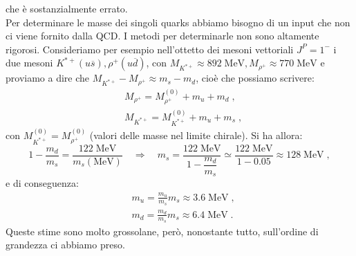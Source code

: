 \documentclass[12pt,a4paper]{article}
\theoremstyle{definition}
\numberwithin{equation}{section}
\begin{document}
che è sostanzialmente errato. \\
Per determinare le masse dei singoli quarks abbiamo bisogno di un input che non ci viene fornito dalla QCD. I metodi per determinarle non sono altamente rigorosi. Consideriamo per esempio nell'ottetto dei mesoni vettoriali $J^P=1^-$ i due mesoni $K^{*+} (u\overline{s}),\rho^+ (u\overline{d})$, con $M_{K^{*+}}\approx 892\;\mathrm{MeV}, M_{\rho^+}\approx 770\;\mathrm{MeV}$ e proviamo a dire che $M_{K^{*+}}-M_{\rho^+}\approx m_s-m_d$, cioè che possiamo scrivere:
\begin{align*}
&M_{\rho^+} = M_{\rho^+}^{(0)}+m_u+m_d\;, \\
&M_{K^{*+}}=M_{K^{*+}}^{(0)}+m_u+m_s\;,
\end{align*}
con $M_{K^{*+}}^{(0)}=M_{\rho^+}^{(0)}$ (valori delle masse nel limite chirale). Si ha allora:
\begin{equation}
1-\frac{m_d}{m_s}=\frac{122\;\mathrm{MeV}}{m_s(\mathrm{MeV})}\quad\Longrightarrow\quad m_s=\frac{122\;\mathrm{MeV}}{1-\dfrac{m_d}{m_s}}\simeq \frac{122\;\mathrm{MeV}}{1-0.05}\approx 128\;\mathrm{MeV}\;,
\end{equation}
e di conseguenza:
\begin{align*}
&m_u=\frac{m_u}{m_s}m_s\approx 3.6\; \mathrm{MeV}\;, \\
&m_d=\frac{m_d}{m_s}m_s\approx 6.4\;\mathrm{MeV}\;.
\end{align*}
Queste stime sono molto grossolane, però, nonostante tutto, sull'ordine di grandezza ci abbiamo preso.
\cleardoublepage
\end{document}
